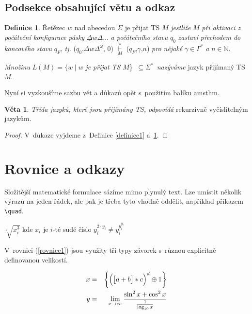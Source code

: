 \documentclass[a4paper,11pt,twocolumn]{article}
\theoremstyle{definition}
\newtheorem{definice}{Definice}
\theoremstyle{definition}
\newtheorem{veta}{Věta}
\theoremstyle{definition}
\begin{document}
\subsection{Podsekce obsahující větu a odkaz}
\begin{definice}
\label{definice2}
Řetězec $w$ nad abecedou $\Sigma$ je přijat TS $M$ \-\emph{jestliže} $M$ \emph{při aktivaci z počáteční konfigurace pásky} $\underline{\Delta}w \Delta... $ \emph{a počátečního stavu} $q_{0}$ \emph{zastaví přechodem do koncového stavu} $q_{F}$, \emph{tj.} ($q_{0}$,$\Delta w \Delta^{\omega}$, 0) $\underset{M}{\overset{*}{\vdash}}$ ($q_{F}$,$\gamma$,$n$) \emph{pro nějaké} $\gamma \in \Gamma^{*}$ \emph{a} $n \in \mathbb{N}$. \par
\emph{Množinu} $L(M) = \{w \mid w$ \emph{je přijat TS} $M$\} $\ \subseteq \Sigma^{*}$~\emph{nazýváme} jazyk přijímaný TS $M$. \\ \par
Nyní si vyzkoušíme sazbu vět a důkazů opět s~použitím balíku {\ttfamily amsthm}.
\end{definice}

\begin{veta}
\label{veta1} \emph{Třída jazyků, které jsou přijímány TS, odpovídá} rekurzivně vyčíslitelným jazykům.
\end{veta}
\begin{proof}
V~důkaze vyjdeme z~Definice \ref{definice1} a~\ref{definice2}.
\end{proof}

\section{Rovnice a odkazy}

Složitější matematické formulace sázíme mimo plynulý text. Lze umístit několik výrazů na jeden řádek, ale pak je třeba tyto vhodně oddělit, například příkazem \verb|\quad|.

\begin{center}
  $\sqrt[i]{x^{3}_{i}}$ \quad kde $x_{i}$ je $i$-té sudé číslo \quad $y_{i}^{2\cdot y_{i}} \neq y_{i}^{y_{i}^{y_{i}}}$
\end{center}

V~rovnici (\ref{rovnice1}) jsou využity tři typy závorek s~různou explicitně definovanou velikostí.

\begin{eqnarray}
  x &= &\bigg\{\Big(\big[a + b\big] * c\Big)^d \oplus 1\bigg\} \label{rovnice1} \\
  y &= &\lim\limits_{x \to \infty}\frac{\textup{sin}^2\,{x} + \textup{cos}^2\,{x}}{\frac{1}{\log_{10} x}}\nonumber
\end{eqnarray}
\end{document}
